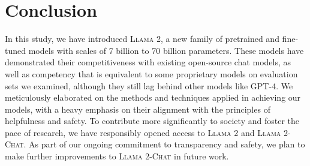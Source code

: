 \documentclass{article}
\newcommand{\modelname}{\textsc{Llama 2-Chat}\xspace}
\newcommand{\cinnamon}{\textsc{Llama 2}\xspace}
\begin{document}
\section{Conclusion}
\label{sec:conclusion}
In this study, we have introduced \cinnamon, a new family of pretrained and fine-tuned models with scales of 7 billion to 70 billion parameters. These models have demonstrated their competitiveness with existing open-source chat models, as well as competency that is equivalent to some proprietary models on evaluation sets we examined, although they still lag behind other models like GPT-4. We meticulously elaborated on the methods and techniques applied in achieving our models, with a heavy emphasis on their alignment with the principles of helpfulness and safety. To contribute more significantly to society and foster the pace of research, we have responsibly opened access to \cinnamon and \modelname{}. As part of our ongoing commitment to transparency and safety, we plan to make further improvements to \modelname{} in future work.


  




\end{document}
